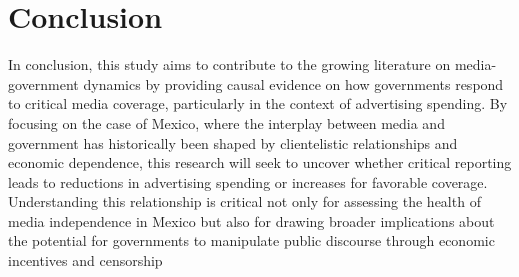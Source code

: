 \section{Conclusion}

\label{sec:conclusion}

In conclusion, this study aims to contribute to the growing literature on media-government dynamics by providing causal evidence on how governments respond to critical media coverage, particularly in the context of advertising spending. By focusing on the case of Mexico, where the interplay between media and government has historically been shaped by clientelistic relationships and economic dependence, this research will seek to uncover whether critical reporting leads to reductions in advertising spending or increases for favorable coverage. Understanding this relationship is critical not only for assessing the health of media independence in Mexico but also for drawing broader implications about the potential for governments to manipulate public discourse through economic incentives and censorship